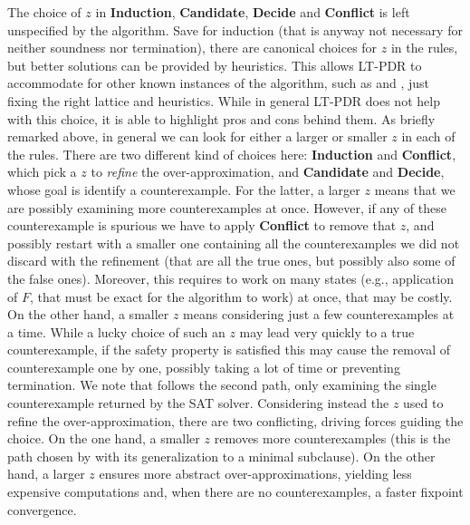 The choice of $z$ in \textbf{Induction}, \textbf{Candidate}, \textbf{Decide} and \textbf{Conflict} is left unspecified by the algorithm. Save for induction (that is anyway not necessary for neither soundness nor termination), there are canonical choices for $z$ in the rules, but better solutions can be provided by heuristics. This allows LT-PDR to accommodate for other known instances of the algorithm, such as  and , just fixing the right lattice and heuristics.
While in general LT-PDR does not help with this choice, it is able to highlight pros and cons behind them. As briefly remarked above, in general we can look for either a larger or smaller $z$ in each of the rules. There are two different kind of choices here: \textbf{Induction} and \textbf{Conflict}, which pick a $z$ to \emph{refine} the over-approximation, and \textbf{Candidate} and \textbf{Decide}, whose goal is identify a counterexample.
For the latter, a larger $z$ means that we are possibly examining more counterexamples at once. However, if any of these counterexample is spurious we have to apply \textbf{Conflict} to remove that $z$, and possibly restart with a smaller one containing all the counterexamples we did not discard with the refinement (that are all the true ones, but possibly also some of the false ones). Moreover, this requires to work on many states (e.g., application of $F$, that must be exact for the algorithm to work) at once, that may be costly. On the other hand, a smaller $z$ means considering just a few counterexamples at a time. While a lucky choice of such an $z$ may lead very quickly to a true counterexample, if the safety property is satisfied this may cause the removal of counterexample one by one, possibly taking a lot of time or preventing termination. We note that  follows the second path, only examining the single counterexample returned by the SAT solver.
Considering instead the $z$ used to refine the over-approximation, there are two conflicting, driving forces guiding the choice. On the one hand, a smaller $z$ removes more counterexamples (this is the path chosen by  with its generalization to a minimal subclause). On the other hand, a larger $z$ ensures more abstract over-approximations, yielding less expensive computations and, when there are no counterexamples, a faster fixpoint convergence.

